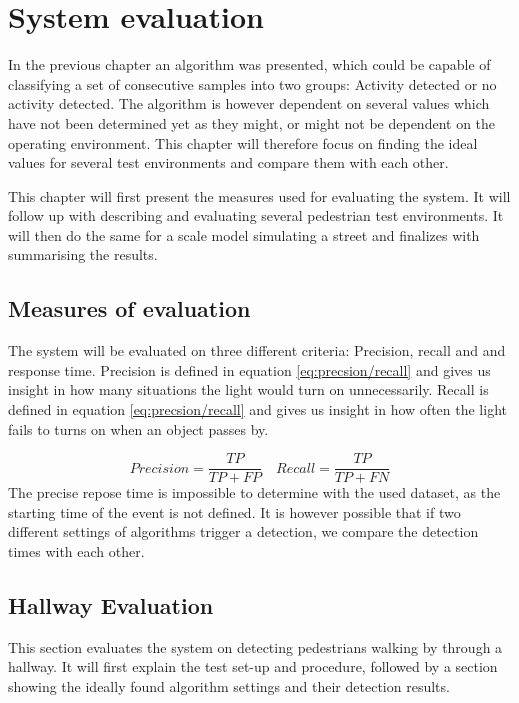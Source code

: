 \chapter{System evaluation}
\label{System_evaluation}
In the previous chapter an algorithm was presented, which could be capable of classifying a set of consecutive samples into two groups: Activity detected or no activity detected. The algorithm is however dependent on several values which have not been determined yet as they might, or might not be dependent on the operating environment. This chapter will therefore focus on finding the ideal values for several test environments and compare them with each other.

This chapter will first present the measures used for evaluating the system. It will follow up with describing and evaluating several pedestrian test environments. It will then do the same for a scale model simulating a street and finalizes with summarising the results.

\section{Measures of evaluation}
The system will be evaluated on three different criteria: Precision, recall and and response time. Precision is defined in equation \ref{eq:precsion/recall} and gives us insight in how many situations the light would turn on unnecessarily. Recall is defined in equation \ref{eq:precsion/recall} and gives us insight in how often the light fails to turns on when an object passes by. 

\begin{equation}
\label{eq:precsion/recall}
Precision = \frac{TP}{TP + FP}
\quad
Recall = \frac{TP}{TP + FN}
\end{equation}
The precise repose time is impossible to determine with the used dataset, as the starting time of the event is not defined. It is however possible that if two different settings of algorithms trigger a detection, we compare the detection times with each other.

\section{Hallway Evaluation}
This section evaluates the system on detecting pedestrians walking by through a hallway. It will first explain the test set-up and procedure, followed by a section showing the ideally found algorithm settings and their detection results.

